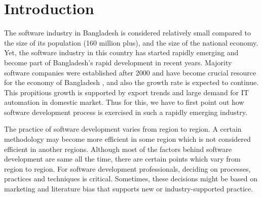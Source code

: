 



\section{Introduction}
\label{introduction}

The software industry in Bangladesh is considered relatively small compared to the size of its population (160 million plus), and the size of the national economy. Yet, the software industry in this country has started rapidly emerging and become part of Bangladesh's rapid development in recent years. Majority software companies were established after 2000 and have become crucial resource for the economy of Bangladesh \cite{Basis2017}, and also the growth rate is expected to continue. This propitious growth is supported by export trends and large demand for IT automation in domestic market. Thus for this, we have to first point out how software development process is exercised in such a rapidly emerging industry. 

The practice of software development varies from region to region. A certain methodology may become more efficient in some region which is not considered efficient in another regions. Although most of the factors behind software development are same all the time, there are certain points which vary from region to region. For software development professionals, deciding on processes, practices and techniques is critical. Sometimes, these decisions might be based on marketing and literature bias that supports new or industry-supported practice.

